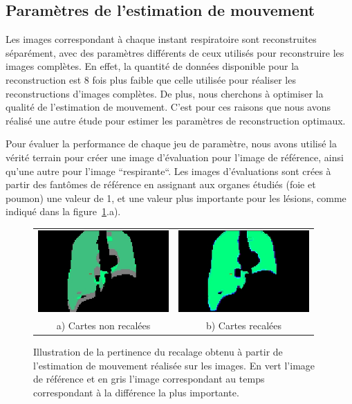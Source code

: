 \subsection{Paramètres de l'estimation de mouvement}

Les images correspondant à chaque instant respiratoire sont reconstruites séparément, avec des paramètres différents de ceux utilisés pour reconstruire les images complètes. En effet, la quantité de données disponible pour la reconstruction est 8 fois plus faible que celle utilisée pour réaliser les reconstructions d'images complètes. De plus, nous cherchons à optimiser la qualité de l'estimation de mouvement. C'est pour ces raisons que nous avons réalisé une autre étude pour estimer les paramètres de reconstruction optimaux. 

Pour évaluer la performance de chaque jeu de paramètre, nous avons utilisé la vérité terrain pour créer une image d'évaluation pour l'image de référence, ainsi qu'une autre pour l'image ``respirante``. Les images d'évaluations sont crées à partir des fantômes de référence en assignant aux organes étudiés (foie et poumon) une valeur de 1, et une valeur plus importante pour les lésions, comme indiqué dans la figure~\ref{lab:perfsFctIterReg}.a). 

\begin{figure}
\centering
\begin{tabular}{c c}
	\includegraphics[width=5cm]{images/sansCorrection} & \includegraphics[width=5cm]{images/avecCorrection} \\
	a) Cartes non recalées				& b) Cartes recalées
\end{tabular}
\caption[Illustration du recalage obtenu]{Illustration de la pertinence du recalage obtenu à partir de l'estimation de mouvement réalisée sur les images. En vert l'image de référence et en gris l'image correspondant au temps correspondant à la différence la plus importante. }
\label{lab:perfsFctIterReg}
\end{figure}

